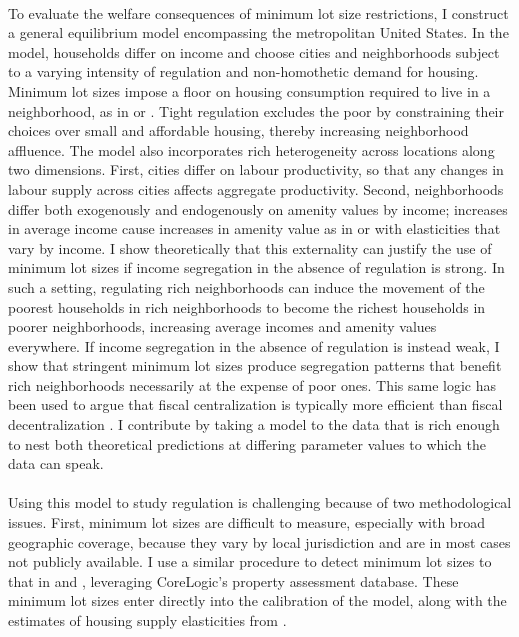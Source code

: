 \documentclass[12pt]{article}
\begin{document}
	\paragraph*{}
	To evaluate the welfare consequences of minimum lot size restrictions, I construct a general equilibrium model encompassing the metropolitan United States. In the model, households differ on income and choose cities and neighborhoods subject to a varying intensity of regulation and non-homothetic demand for housing. Minimum lot sizes impose a floor on housing consumption required to live in a neighborhood, as in \cite{kulka} or \cite{calabresetal}. Tight regulation excludes the poor by constraining their choices over small and affordable housing, thereby increasing neighborhood affluence. The model also incorporates rich heterogeneity across locations along two dimensions. First, cities differ on labour productivity, so that any changes in labour supply across cities affects aggregate productivity. Second, neighborhoods differ both exogenously and endogenously on amenity values by income; increases in average income cause increases in amenity value as in \citet{parispoor} or \citet{ghh2013} with elasticities that vary by income. I show theoretically that this externality can justify the use of minimum lot sizes if income segregation in the absence of regulation is strong. In such a setting, regulating rich neighborhoods can induce the movement of the poorest households in rich neighborhoods to become the richest households in poorer neighborhoods, increasing average incomes and amenity values everywhere. If income segregation in the absence of regulation is instead weak, I show that stringent minimum lot sizes produce segregation patterns that benefit rich neighborhoods necessarily at the expense of poor ones. This same logic has been used to argue that fiscal centralization is typically more efficient than fiscal decentralization \citep{ineffTiebout}. I contribute by taking a model to the data that is rich enough to nest both theoretical predictions at differing parameter values to which the data can speak.
	
	\paragraph*{}
	Using this model to study regulation is challenging because of two methodological issues. First, minimum lot sizes are difficult to measure, especially with broad geographic coverage, because they vary by local jurisdiction and are in most cases not publicly available. I use a similar procedure to detect minimum lot sizes to that in \cite{Song} and \cite{Cui}, leveraging CoreLogic's property assessment database. These minimum lot sizes enter directly into the calibration of the model, along with the estimates of housing supply elasticities from \cite{BSH}. 
	 
\end{document}
